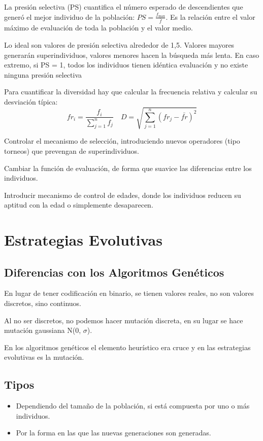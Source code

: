 \documentclass[12pt, twoside, openright]{report} %
\begin{document}
La presión selectiva (PS) cuantifica el número esperado de descendientes que generó el mejor individuo de la población: $PS=\frac{f_{\max}}{\bar{f}}$. Es la relación entre el valor máximo de evaluación de toda la población y el valor medio.

Lo ideal son valores de presión selectiva alrededor de 1,5. Valores mayores generarán superindividuos, valores menores hacen la búsqueda más lenta. En caso extremo, si PS = 1, todos los individuos tienen idéntica evaluación y no existe ninguna presión selectiva

Para cuantificar la diversidad hay que calcular la frecuencia relativa y calcular su desviación típica:
$$fr_i=\frac{f_i}{\sum_{j=1}^n f_j} \quad D=\sqrt{\sum_{j=1}^n (fr_j-\bar{fr})^2}$$

Controlar el mecanismo de selección, introduciendo nuevos operadores (tipo torneos) que prevengan de superindividuos.

Cambiar la función de evaluación, de forma que suavice las diferencias entre los individuos.

Introducir mecanismo de control de edades, donde los individuos reducen su aptitud con la edad o simplemente desaparecen.

\chapter{Estrategias Evolutivas}

\section{Diferencias con los Algoritmos Genéticos}
En lugar de tener codificación en binario, se tienen valores reales, no son valores discretos, sino continuos.

Al no ser discretos, no podemos hacer mutación discreta, en su lugar se hace mutación gaussiana N(0, $\sigma$).

En los algoritmos genéticos el elemento heurístico era cruce y en las estrategias evolutivas es la mutación.

\section{Tipos}
\begin{itemize}
	\item Dependiendo del tamaño de la población, si está compuesta por uno o más individuos.
	\item Por la forma en las que las nuevas generaciones son generadas.
\end{itemize}
\end{document}
